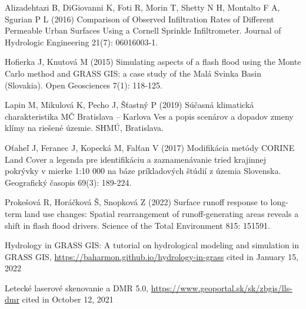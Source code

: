 {Alizadehtazi B, DiGiovanni K, Foti R, Morin T, Shetty N H, Montalto F A, Sgurian P L (2016) Comparison of Observed Infiltration Rates of Different Permeable Urban Surfaces Using a Cornell Sprinkle Infiltrometer. Journal of Hydrologic Engineering 21(7): 06016003-1.

Hofierka J, Knutová M (2015) Simulating aspects of a flash flood using the Monte Carlo method and GRASS GIS: a case study of the Malá Svinka Basin (Slovakia). Open Geosciences 7(1): 118-125.

Lapin M, Mikulová K, Pecho J, Šťastný P (2019) Súčasná klimatická charakteristika MČ Bratislava – Karlova Ves a popis scenárov a dopadov zmeny klímy na riešené územie. SHMÚ, Bratislava.

Oťaheľ J, Feranec J, Kopecká M, Falťan V (2017) Modifikácia metódy CORINE Land Cover a legenda pre identifikáciu a zaznamenávanie tried krajinnej pokrývky v mierke 1:10 000 na báze príkladových štúdií z územia Slovenska. Geografický časopis 69(3): 189-224.

Prokešová R, Horáčková Š, Snopková Z (2022) Surface runoff response to long-term land use changes: Spatial rearrangement of runoff-generating areas reveals a shift in flash flood drivers. Science of the Total Environment 815: 151591.

Hydrology in GRASS GIS: A tutorial on hydrological modeling and simulation in GRASS GIS, \url{https://baharmon.github.io/hydrology-in-grass} cited in January 15, 2022

Letecké laserové skenovanie a DMR 5.0, \url{https://www.geoportal.sk/sk/zbgis/lls-dmr} cited in October 12, 2021
}%

